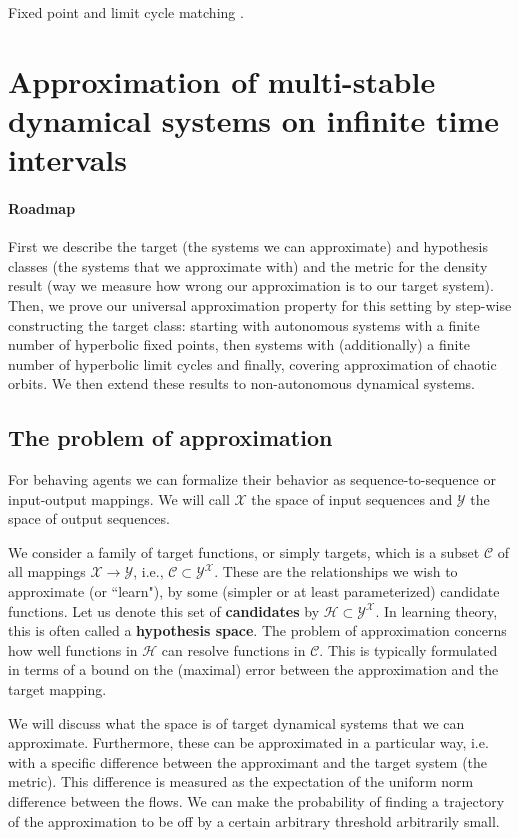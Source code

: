 \documentclass{article}
\theoremstyle{definition}
\theoremstyle{remark}
\newcounter{ct}
\begin{document}
Fixed point and limit cycle matching \citep{cohen1992construction}.


\section{Approximation of multi-stable dynamical systems on infinite time intervals}
\paragraph{Roadmap}
First we describe the target (the systems we can approximate) and hypothesis classes (the systems that we approximate with) and the metric for the density result (way we measure how wrong our approximation is to our target system).
Then, we prove our universal approximation property for this setting by step-wise constructing the target class:
starting with autonomous systems with a finite number of hyperbolic fixed points,
then systems with (additionally) a finite number of hyperbolic limit cycles
and finally, covering approximation of chaotic orbits.
We then extend these results to non-autonomous dynamical systems.



\subsection{The problem of approximation}\label{sec:approximationtheory} %
For behaving agents we can formalize their behavior as sequence-to-sequence or input-output mappings.
We will call $\mathcal{X}$ the space of input sequences and $\mathcal{Y}$ the space of output sequences.

We consider a family of target functions, or simply targets, which is a subset \(\mathcal{C} \) of all mappings \( \mathcal{X} \rightarrow \mathcal{Y} \), i.e., \( \mathcal{C} \subset \mathcal{Y}^\mathcal{X} \). 
These are the relationships we wish to approximate (or ``learn"), by some (simpler or at least parameterized) candidate functions.
Let us denote this set of \textbf{candidates} by \( \mathcal{H} \subset \mathcal{Y}^\mathcal{X} \).
In learning theory, this is often called a \textbf{hypothesis space}.
The problem of approximation concerns how well functions in \( \mathcal{H} \) can resolve functions in \( \mathcal{C} \).
This is typically formulated in terms of a bound on the (maximal) error between the approximation and the target mapping.

We will discuss what the space is of target dynamical systems that we can approximate.
Furthermore, these can be approximated in a particular way, i.e. with a specific difference between the approximant and the target system (the metric).
This difference is measured as the expectation of the uniform norm difference between the flows. 
We can make the probability of finding a trajectory of the approximation to be off by a certain arbitrary threshold arbitrarily small. 
\end{document}
